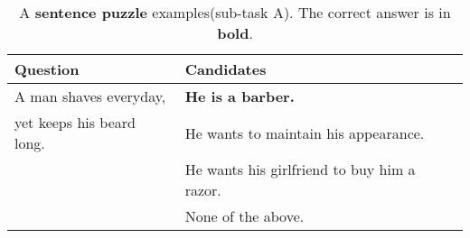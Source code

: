 \begin{table}
	\caption{A \textbf{sentence puzzle} examples(sub-task A). The correct answer is in \textbf{bold}.}
	\label{tab:sentence-puzzle-q}
	\begin{center}
		\begin{tabular}{p{3.5cm}|p{3.5cm}}
			\toprule
			Question                  & Candidates                                  \\
			\midrule
			A man shaves everyday,    & \textbf{He is a barber.}                    \\
			yet keeps his beard long. & He wants to maintain his appearance.        \\
			                          & He wants his girlfriend to buy him a razor. \\
			                          & None of the above.                          \\
			\bottomrule
		\end{tabular}
	\end{center}
\end{table}

